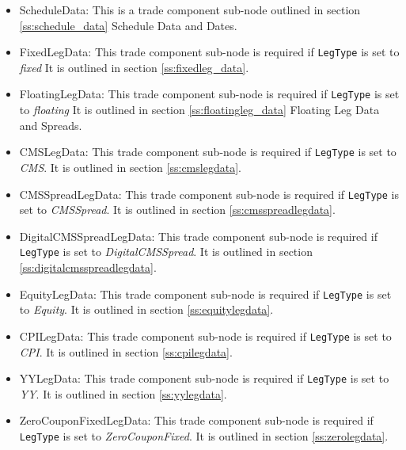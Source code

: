 \begin{itemize}
\item ScheduleData: This is a trade component sub-node outlined in section \ref{ss:schedule_data} Schedule Data and
Dates.
\item FixedLegData: This trade component sub-node is required if \lstinline!LegType! is set to \emph{fixed} It is
outlined in section \ref{ss:fixedleg_data}.
\item FloatingLegData: This trade component sub-node is required if \lstinline!LegType! is set to \emph{floating} It is
outlined in section \ref{ss:floatingleg_data} Floating Leg Data and Spreads.
\item CMSLegData: This trade component sub-node is required if \lstinline!LegType! is set to \emph{CMS}. It is
  outlined in section \ref{ss:cmslegdata}.
\item CMSSpreadLegData: This trade component sub-node is required if \lstinline!LegType! is set to \emph{CMSSpread}. It is
  outlined in section \ref{ss:cmsspreadlegdata}.
\item DigitalCMSSpreadLegData: This trade component sub-node is required if \lstinline!LegType! is set to \emph{DigitalCMSSpread}. It is
  outlined in section \ref{ss:digitalcmsspreadlegdata}.
\item EquityLegData: This trade component sub-node is required if \lstinline!LegType! is set to \emph{Equity}. It is
  outlined in section \ref{ss:equitylegdata}.    
\item CPILegData: This trade component sub-node is required if \lstinline!LegType! is set to \emph{CPI}. It is
  outlined in section \ref{ss:cpilegdata}.
\item YYLegData: This trade component sub-node is required if \lstinline!LegType! is set to \emph{YY}. It is
  outlined in section \ref{ss:yylegdata}.
\item ZeroCouponFixedLegData: This trade component sub-node is required if \lstinline!LegType! is set to \emph{ZeroCouponFixed}. It is
  outlined in section \ref{ss:zerolegdata}.
\end{itemize}
